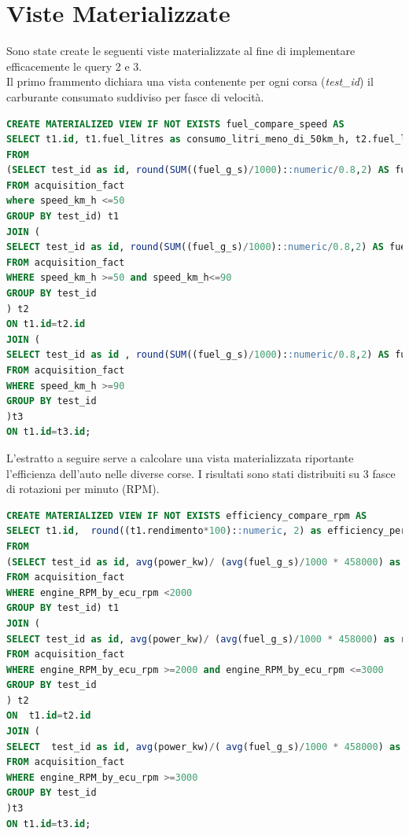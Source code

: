 \section{Viste Materializzate}
Sono state create le seguenti viste materializzate al fine di implementare efficacemente le query 2 e 3.
\\
Il primo frammento dichiara una vista contenente per ogni corsa (\textit{test\_id}) il carburante consumato suddiviso per fasce di velocità.
\begin{lstlisting}[language=SQL]
CREATE MATERIALIZED VIEW IF NOT EXISTS fuel_compare_speed AS
SELECT t1.id, t1.fuel_litres as consumo_litri_meno_di_50km_h, t2.fuel_litres as consumo_litri_meno_di_90km_h, t3.fuel_litres as consumo_litri_meno_di_130km_h
FROM
(SELECT test_id as id, round(SUM((fuel_g_s)/1000)::numeric/0.8,2) AS fuel_litres, round(AVG(velocity_km_h)::numeric,1) as average_speed_km_h
FROM acquisition_fact
where speed_km_h <=50
GROUP BY test_id) t1
JOIN (
SELECT test_id as id, round(SUM((fuel_g_s)/1000)::numeric/0.8,2) AS fuel_litres, round(AVG(velocity_km_h)::numeric,1) as average_speed_km_h
FROM acquisition_fact
WHERE speed_km_h >=50 and speed_km_h<=90
GROUP BY test_id
) t2
ON t1.id=t2.id
JOIN (
SELECT test_id as id , round(SUM((fuel_g_s)/1000)::numeric/0.8,2) AS fuel_litres, round(AVG(velocity_km_h)::numeric,1) as average_speed_km_h
FROM acquisition_fact
WHERE speed_km_h >=90
GROUP BY test_id
)t3
ON t1.id=t3.id;
\end{lstlisting}

L'estratto a seguire serve a calcolare una vista materializzata riportante l'efficienza dell'auto nelle diverse corse. I risultati sono stati distribuiti su 3 fasce di rotazioni per minuto (RPM).
\begin{lstlisting}[language=SQL]
CREATE MATERIALIZED VIEW IF NOT EXISTS efficiency_compare_rpm AS
SELECT t1.id,  round((t1.rendimento*100)::numeric, 2) as efficiency_perc_max2000rpm, round((t2.rendimento*100)::numeric,2) as efficiency_perc_max3000rpm, round((t3.rendimento*100)::numeric,2) as efficiency_perc_over3000rpm
FROM
(SELECT test_id as id, avg(power_kw)/ (avg(fuel_g_s)/1000 * 458000) as rendimento
FROM acquisition_fact
WHERE engine_RPM_by_ecu_rpm <2000
GROUP BY test_id) t1
JOIN (
SELECT test_id as id, avg(power_kw)/ (avg(fuel_g_s)/1000 * 458000) as rendimento
FROM acquisition_fact
WHERE engine_RPM_by_ecu_rpm >=2000 and engine_RPM_by_ecu_rpm <=3000
GROUP BY test_id
) t2
ON  t1.id=t2.id
JOIN (
SELECT  test_id as id, avg(power_kw)/( avg(fuel_g_s)/1000 * 458000) as rendimento
FROM acquisition_fact
WHERE engine_RPM_by_ecu_rpm >=3000
GROUP BY test_id
)t3
ON t1.id=t3.id;
\end{lstlisting}